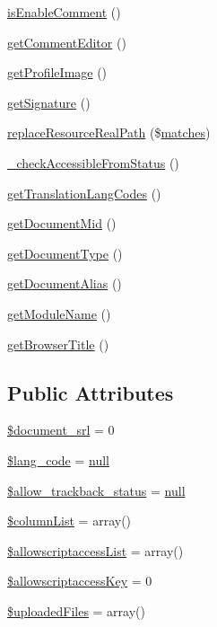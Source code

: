 \begin{DoxyCompactItemize}
\item 
\hyperlink{classdocumentItem_aff71a0f39ddc720c21c5cf39805b31a8}{is\+Enable\+Comment} ()
\item 
\hyperlink{classdocumentItem_a59ef94b52cf1a250aa4f29990e8d376d}{get\+Comment\+Editor} ()
\item 
\hyperlink{classdocumentItem_afb95c0b0d6d9106c737d8eeb51a3c834}{get\+Profile\+Image} ()
\item 
\hyperlink{classdocumentItem_a03b199ae0def81ea3a9067bbb0186f17}{get\+Signature} ()
\item 
\hyperlink{classdocumentItem_a47d377b1f8ae94615b363f4f00bc94fc}{replace\+Resource\+Real\+Path} (\$\hyperlink{jquery_8mobile_8customized_8min_8js_a0dd9fb10d0da7ad1a1c71aad2c6388f7}{matches})
\item 
\hyperlink{classdocumentItem_a16bc4bb18f4e29b0244e647eb89e2f45}{\+\_\+check\+Accessible\+From\+Status} ()
\item 
\hyperlink{classdocumentItem_afd284f32681755444c28e93c14f55c28}{get\+Translation\+Lang\+Codes} ()
\item 
\hyperlink{classdocumentItem_ae8d90b15c65199e9acb4622b3da43119}{get\+Document\+Mid} ()
\item 
\hyperlink{classdocumentItem_a393ee98eeada92d1bd3b41f5018f746e}{get\+Document\+Type} ()
\item 
\hyperlink{classdocumentItem_adad3fafeaac19dfed4bea9e5709677d4}{get\+Document\+Alias} ()
\item 
\hyperlink{classdocumentItem_abc1a8bc25ecdbf936fba6e62b773b01c}{get\+Module\+Name} ()
\item 
\hyperlink{classdocumentItem_a386ced6121facbf9f54c2675afb8a037}{get\+Browser\+Title} ()
\end{DoxyCompactItemize}
\subsection*{Public Attributes}
\begin{DoxyCompactItemize}
\item 
\hyperlink{classdocumentItem_a87159d1cf24944d081646e6fe4f7e0f6}{\$document\+\_\+srl} = 0
\item 
\hyperlink{classdocumentItem_a5fa7aa5d52f248116250e95126e8ab87}{\$lang\+\_\+code} = \hyperlink{modernizr_8min_8js_a286f9ec831c5e676eeb493248eab9575}{null}
\item 
\hyperlink{classdocumentItem_aaf08d80bedc01fc0fc0370677a4ba9cc}{\$allow\+\_\+trackback\+\_\+status} = \hyperlink{modernizr_8min_8js_a286f9ec831c5e676eeb493248eab9575}{null}
\item 
\hyperlink{classdocumentItem_a244e1382304e15c5ae29e3311ef8e865}{\$column\+List} = array()
\item 
\hyperlink{classdocumentItem_a3b10cc840f3a20580d3ab2269ef24df3}{\$allowscriptaccess\+List} = array()
\item 
\hyperlink{classdocumentItem_ab4273ebe05df985235bf651d918bd4f8}{\$allowscriptaccess\+Key} = 0
\item 
\hyperlink{classdocumentItem_a70d4321ea0edfb6c1fb0775ced8a6b41}{\$uploaded\+Files} = array()
\end{DoxyCompactItemize}


